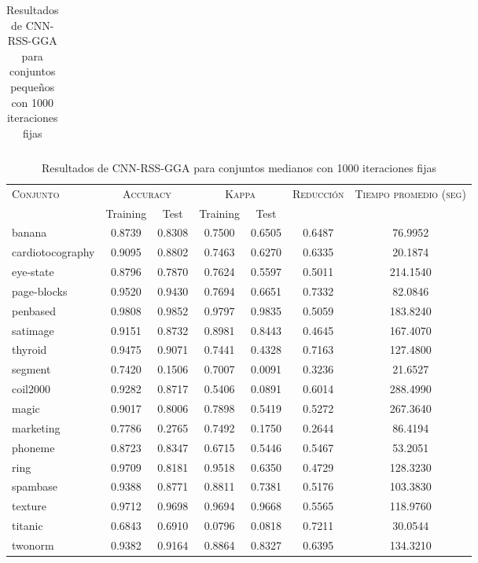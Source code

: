 \begin{table}[]
\begin{tabular}{l c c c c c c}
\hline
\end{tabular}
\caption{Resultados de CNN-RSS-GGA para conjuntos pequeños con 1000 iteraciones fijas}
\label{res-peq-cnn-rss-gga}
\end{table}



\begin{table}[]
\centering
\begin{tabular}{l c c c c c c}
\hline
\multirow{2}{*}{\textsc{Conjunto}}
	& \multicolumn{2}{c}{\textsc{Accuracy}}
	& \multicolumn{2}{c}{\textsc{Kappa}}
	& \textsc{Reducción}
	& \textsc{Tiempo promedio (seg)} \\
	& Training & Test
	& Training & Test \\ 
\hline
\hline

banana & 0.8739 & 0.8308 & 0.7500 & 0.6505 & 0.6487 & 76.9952 \\
cardiotocography & 0.9095 & 0.8802 & 0.7463 & 0.6270 & 0.6335 & 20.1874 \\
eye-state & 0.8796 & 0.7870 & 0.7624 & 0.5597 & 0.5011 & 214.1540 \\
page-blocks & 0.9520 & 0.9430 & 0.7694 & 0.6651 & 0.7332 & 82.0846 \\
penbased & 0.9808 & 0.9852 & 0.9797 & 0.9835 & 0.5059 & 183.8240 \\
satimage & 0.9151 & 0.8732 & 0.8981 & 0.8443 & 0.4645 & 167.4070 \\
thyroid & 0.9475 & 0.9071 & 0.7441 & 0.4328 & 0.7163 & 127.4800 \\
segment & 0.7420 & 0.1506 & 0.7007 & 0.0091 & 0.3236 & 21.6527 \\
coil2000 & 0.9282 & 0.8717 & 0.5406 & 0.0891 & 0.6014 & 288.4990 \\
magic & 0.9017 & 0.8006 & 0.7898 & 0.5419 & 0.5272 & 267.3640 \\
marketing & 0.7786 & 0.2765 & 0.7492 & 0.1750 & 0.2644 & 86.4194 \\
phoneme & 0.8723 & 0.8347 & 0.6715 & 0.5446 & 0.5467 & 53.2051 \\
ring & 0.9709 & 0.8181 & 0.9518 & 0.6350 & 0.4729 & 128.3230 \\
spambase & 0.9388 & 0.8771 & 0.8811 & 0.7381 & 0.5176 & 103.3830 \\
texture & 0.9712 & 0.9698 & 0.9694 & 0.9668 & 0.5565 & 118.9760 \\
titanic & 0.6843 & 0.6910 & 0.0796 & 0.0818 & 0.7211 & 30.0544 \\
twonorm & 0.9382 & 0.9164 & 0.8864 & 0.8327 & 0.6395 & 134.3210 \\

\hline
\end{tabular}
\caption{Resultados de CNN-RSS-GGA para conjuntos medianos con 1000 iteraciones fijas}
\label{res-med-cnn-rss-gga}
\end{table}



